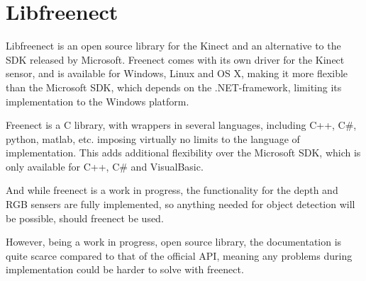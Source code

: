 \section{Libfreenect}

Libfreenect\cite{libfreenect} is an open source library for the Kinect and an alternative to the SDK released
by Microsoft. Freenect comes with its own driver for the Kinect sensor, and is available for Windows, Linux
and OS X, making it more flexible than the Microsoft SDK, which depends on the .NET-framework\cite{kinectwindows},
limiting its implementation to the Windows platform.

Freenect is a C library, with wrappers in several languages, including C++, C\#, python, matlab, etc.
imposing virtually no limits to the language of implementation. This adds additional flexibility over
the Microsoft SDK, which is only available for C++, C\# and VisualBasic.

And while freenect is a work in progress, the functionality for the depth and RGB sensers are fully implemented,
so anything needed for object detection will be possible, should freenect be used.

However, being a work in progress, open source library, the documentation is quite scarce compared to
that of the official API, meaning any problems during implementation could be harder to solve with freenect.

